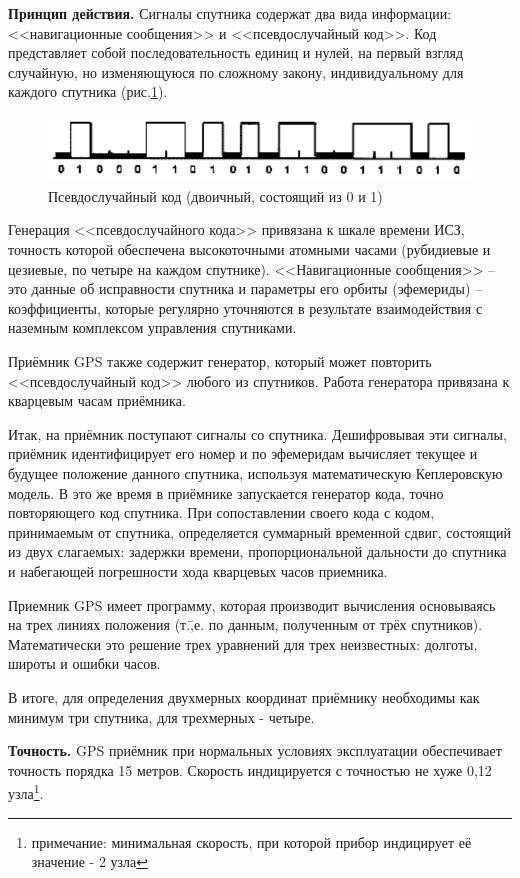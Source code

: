 \documentclass[a4paper, 12pt, twoside, final, book, russian, fittopage, cyremdash]{ncc}
\newcommand{\ris}[1]{\ref{fig:#1}}
\begin{document}
\textbf{Принцип действия.} Сигналы спутника содержат два вида информации: <<навигационные сообщения>> и <<псевдослучайный код>>. Код представляет собой последовательность единиц и нулей, на первый взгляд случайную, но изменяющуюся по сложному закону, индивидуальному для каждого спутника (рис.\ris{S1}). 

\begin{figure}[htb]
  \centering{}
  \includegraphics{S001}
  \caption{Псевдослучайный код (двоичный, состоящий из 0 и 1)}
  \label{fig:S1}
\end{figure}

Генерация <<псевдослучайного кода>> привязана к шкале времени ИСЗ, точность которой обеспечена высокоточными атомными часами (рубидиевые и цезиевые, по четыре на каждом спутнике). <<Навигационные сообщения>> \--- это данные об исправности спутника и параметры его орбиты (эфемериды) \--- коэффициенты, которые регулярно уточняются в результате взаимодействия с наземным комплексом управления спутниками. 

Приёмник GPS также содержит генератор, который может повторить <<псевдослучайный код>> любого из спутников. Работа генератора привязана к кварцевым часам приёмника. 

Итак, на приёмник поступают сигналы со спутника. Дешифровывая эти сигналы, приёмник идентифицирует его номер и по эфемеридам вычисляет текущее и будущее положение данного спутника, используя математическую Кеплеровскую модель. В это же время в приёмнике запускается генератор кода, точно повторяющего код спутника. При сопоставлении своего кода с кодом, принимаемым от спутника, определяется суммарный временной сдвиг, состоящий из двух слагаемых: задержки времени, пропорциональной дальности до спутника и набегающей погрешности хода кварцевых часов приемника.
 
Приемник GPS имеет программу, которая производит вычисления основываясь на трех линиях положения (т.\=,е. по данным, полученным от трёх спутников). Математически это решение трех уравнений для трех неизвестных: долготы, широты и ошибки часов.
 
В итоге, для определения двухмерных координат приёмнику необходимы как минимум три спутника, для трехмерных \-- четыре. 

\textbf{Точность.} GPS приёмник при нормальных условиях эксплуатации обеспечивает точность порядка 15 метров. Скорость индицируется с точностью не хуже 0,12 узла\footnote{примечание: минимальная скорость, при которой прибор индицирует её значение - 2 узла}. 
\end{document}
